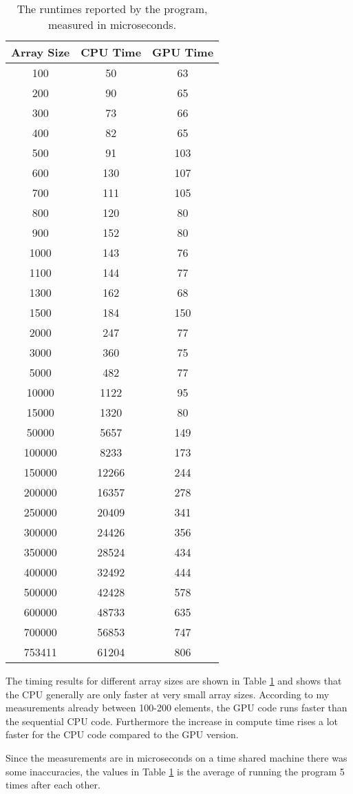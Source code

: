 \begin{table}
    \center
    \begin{tabular}{|c|c|c|}
        \hline
        \textbf{Array Size} & \textbf{CPU Time} & \textbf{GPU Time} \\\hline
           100 &    50 &  63 \\
           200 &    90 &  65 \\
           300 &    73 &  66 \\
           400 &    82 &  65 \\
           500 &    91 & 103 \\
           600 &   130 & 107 \\
           700 &   111 & 105 \\
           800 &   120 &  80 \\
           900 &   152 &  80 \\
          1000 &   143 &  76 \\
          1100 &   144 &  77 \\
          1300 &   162 &  68 \\
          1500 &   184 & 150 \\
          2000 &   247 &  77 \\
          3000 &   360 &  75 \\
          5000 &   482 &  77 \\
         10000 &  1122 &  95 \\
         15000 &  1320 &  80 \\
         50000 &  5657 & 149 \\
        100000 &  8233 & 173 \\
        150000 & 12266 & 244 \\
        200000 & 16357 & 278 \\
        250000 & 20409 & 341 \\
        300000 & 24426 & 356 \\
        350000 & 28524 & 434 \\
        400000 & 32492 & 444 \\
        500000 & 42428 & 578 \\
        600000 & 48733 & 635 \\
        700000 & 56853 & 747 \\
        753411 & 61204 & 806 \\\hline
    \end{tabular}
    \caption{The runtimes reported by the program, measured in microseconds.}
    \label{tab:times}
\end{table}


The timing results for different array sizes are shown in Table \ref{tab:times}
and shows that the CPU generally are only faster at very small array sizes.
According to my measurements already between 100-200 elements, the GPU code runs
faster than the sequential CPU code. Furthermore the increase in compute time
rises a lot faster for the CPU code compared to the GPU version.

Since the measurements are in microseconds on a time shared machine there was
some inaccuracies, the values in Table \ref{tab:times} is the average of running
the program 5 times after each other.
